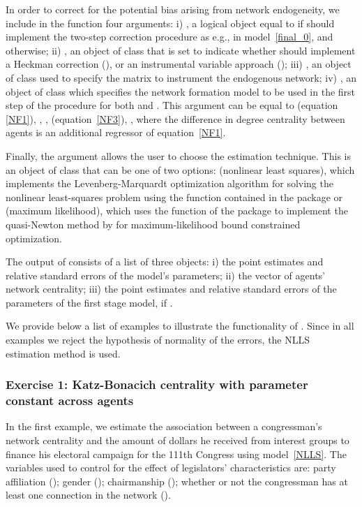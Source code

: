 \documentclass[nojss]{jss}
\begin{document}
	In order to correct for the potential bias arising from network endogeneity, we include in the function four arguments: i) , a logical object equal to  if  should implement the two-step correction procedure as e.g., in model~\ref{final_0}, and 
	otherwise; ii) , an object of class  that is set to indicate whether  should implement a Heckman correction (), or an instrumental variable approach (); iii) ,
	an object of class  used to specify the matrix to instrument the endogenous network; iv) , an object of class  which specifies the network formation model to be used in the first step of the procedure for both  and . This argument can be equal to  (equation~
	\ref{NF1}),  \cite[equation~\ref{NF2}, as in][]{Fafchamps+Leij+Goyal:2010},
	\cite[equation~\ref{NF2}, as in][]{Graham:2015},  (equation~\ref{NF3}), , where the difference in degree centrality between agents is an additional regressor of equation~\ref{NF1}.
	
	Finally, the argument  allows the user to choose the estimation technique. This is an object of class  that can be one of two options:  (nonlinear least squares), which implements the Levenberg-Marquardt optimization algorithm for solving the nonlinear least-squares problem using the function  contained in the  package  \citep{minpack.lm} or  (maximum likelihood), which uses the function  of the  package  to implement the quasi-Newton method by \cite{bbmle} for maximum-likelihood bound constrained optimization.
	
	The output of  consists of a list of three objects: i) the point estimates and relative standard errors of the model's parameters; ii) the vector of agents' network centrality; iii) the point estimates and relative standard errors of the parameters of the first stage model, if .
	
	We provide below a list of examples to illustrate the functionality of . Since in all examples we reject the hypothesis of normality of the errors, the NLLS estimation method is used.
	
	\subsubsection{Exercise 1: Katz-Bonacich centrality with parameter constant across agents}
	In the first example, we estimate the association between a congressman's network centrality and the amount of dollars he received from interest groups to finance his electoral campaign for the 111th Congress using model~\ref{NLLS}. The variables used to control for the effect of legislators' characteristics are: party affiliation (); gender (); chairmanship (); whether or not the congressman has at least one connection in the network ().
	
\end{document}
